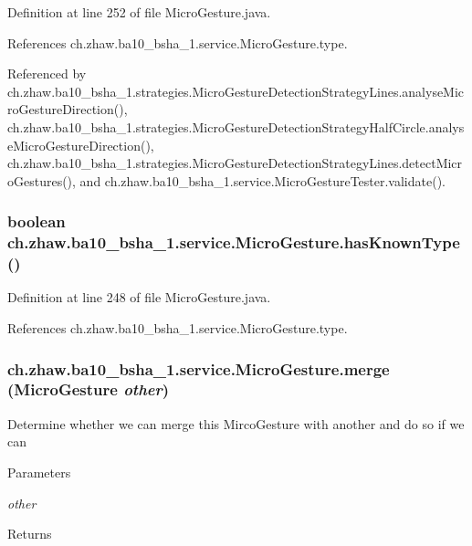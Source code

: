 Definition at line 252 of file MicroGesture.java.

References ch.zhaw.ba10\_\-bsha\_\-1.service.MicroGesture.type.

Referenced by ch.zhaw.ba10\_\-bsha\_\-1.strategies.MicroGestureDetectionStrategyLines.analyseMicroGestureDirection(), ch.zhaw.ba10\_\-bsha\_\-1.strategies.MicroGestureDetectionStrategyHalfCircle.analyseMicroGestureDirection(), ch.zhaw.ba10\_\-bsha\_\-1.strategies.MicroGestureDetectionStrategyLines.detectMicroGestures(), and ch.zhaw.ba10\_\-bsha\_\-1.service.MicroGestureTester.validate().\hypertarget{classch_1_1zhaw_1_1ba10__bsha__1_1_1service_1_1MicroGesture_a85e524f74a8ae04db9418ddecb835bcd}{
\subsubsection[{hasKnownType}]{\setlength{\rightskip}{0pt plus 5cm}boolean ch.zhaw.ba10\_\-bsha\_\-1.service.MicroGesture.hasKnownType ()}}
\label{classch_1_1zhaw_1_1ba10__bsha__1_1_1service_1_1MicroGesture_a85e524f74a8ae04db9418ddecb835bcd}


Definition at line 248 of file MicroGesture.java.

References ch.zhaw.ba10\_\-bsha\_\-1.service.MicroGesture.type.\hypertarget{classch_1_1zhaw_1_1ba10__bsha__1_1_1service_1_1MicroGesture_a363ee314636824c156497dd7138edaa9}{
\subsubsection[{merge}]{ ch.zhaw.ba10\_\-bsha\_\-1.service.MicroGesture.merge ({\bf MicroGesture} {\em other})}}
\label{classch_1_1zhaw_1_1ba10__bsha__1_1_1service_1_1MicroGesture_a363ee314636824c156497dd7138edaa9}
Determine whether we can merge this MircoGesture with another and do so if we can


\begin{DoxyParams}{Parameters}
\item[{\em other}]\end{DoxyParams}
\begin{DoxyReturn}{Returns}

\end{DoxyReturn}


